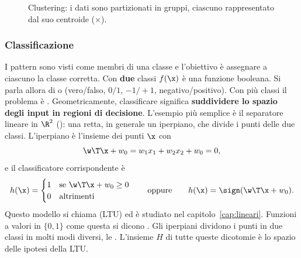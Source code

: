\begin{figure}[ht]
\centering
{}
\caption{Clustering: i dati sono partizionati in gruppi, ciascuno rappresentato dal suo centroide ($\times$).}
\label{fig:clustering}
\end{figure}

\subsubsection{Classificazione}
I pattern sono visti come membri di una classe e l'obiettivo è assegnare a ciascuno la classe corretta. Con
\textbf{due} classi $f(\x)$ è una funzione booleana. Si parla allora di  o
 (vero/falso, $0/1$, $-1/+1$, negativo/positivo). Con più classi il problema è
. Geometricamente, classificare significa \textbf{suddividere lo spazio degli input in
regioni di decisione}. L'esempio più semplice è il separatore lineare in $\R^2$ (): una
retta, in generale un iperpiano, che divide i punti delle due classi. L'iperpiano è l'insieme dei punti $\x$ con
\[
\w\T\x + w_0 = w_1x_1 + w_2x_2 + w_0 = 0,
\]
e il classificatore corrispondente è
\[
h(\x) = \begin{cases} 1 & \text{se } \w\T\x+w_0\ge 0\\ 0 & \text{altrimenti}\end{cases}
\qquad\text{oppure}\qquad h(\x) = \sign(\w\T\x+w_0).
\]
Questo modello si chiama  (LTU) ed è studiato nel capitolo~\ref{cap:lineari}.
Funzioni a valori in $\{0,1\}$ come questa si dicono . Gli iperpiani dividono i
punti in due classi in molti modi diversi, le . L'insieme $H$ di tutte queste dicotomie è lo
spazio delle ipotesi della LTU.

